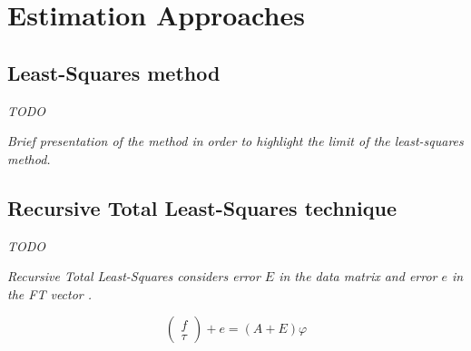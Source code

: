 \documentclass[/home/francois/latex/report/main.tex]{subfiles}
\begin{document}
\section{Estimation Approaches}

\subsection{Least-Squares method}

\textit{TODO}

{\it
Brief presentation of the method in order to highlight the limit of the least-squares method.
}

\subsection{Recursive Total Least-Squares technique}

\textit{TODO}

{\it
Recursive Total Least-Squares considers error $E$ in the data matrix and error $e$ in the \ac{FT} vector \cite{Kubus2008}
.

\begin{equation}
 \begin{pmatrix}
  f    \\
  \tau
 \end{pmatrix} + e
 = (A + E) \varphi
\end{equation}
}
\end{document}
